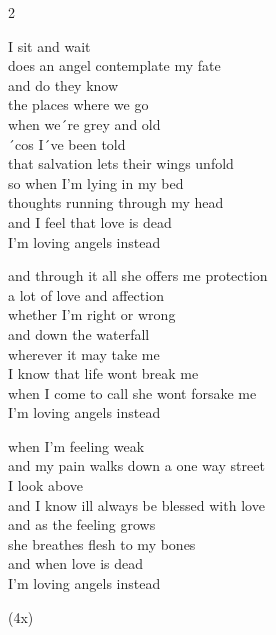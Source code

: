\begin{multicols}{2}

\ve
{}I sit and wait \\
does an angel contemplate my fate\\ 
and do they know\\
the places where we go\\
when we´re grey and old \\
´cos I´ve been told \\
that salvation lets their wings unfold \\
so when I’m lying in my bed \\
thoughts running through my head\\
and I feel that love is dead\\
I’m loving angels instead

\cho{}
and through it all she offers me protection\\
a lot of love and affection\\ 
whether I’m right or wrong\\
and down the waterfall\\
wherever it may take me\\
I know that life wont break me\\
when I come to call she wont forsake me\\ 
I’m loving angels instead  

\vfill\columnbreak\vspace*{\fill}

\ve
{}when I’m feeling weak\\
and my pain walks down a one way street\\
I look above\\
and I know ill always be blessed with love\\
and as the feeling grows\\
she breathes flesh to my bones\\
and when love is dead\\
I’m loving angels instead

\cho{}

(4x)

\cho{}
\end{multicols}

\esong{}